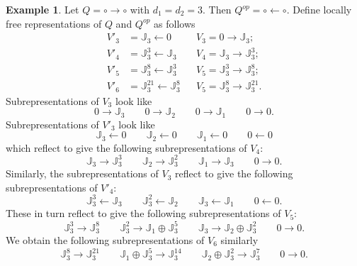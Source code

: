 \documentclass{amsart}
\numberwithin{equation}{section}
\theoremstyle{definition}
\newtheorem{example}[theorem]{Example}
\def\JJ{\mathbb{J}}
\begin{document}
\begin{example}
  Let $Q=\circ\longrightarrow\circ$ with $d_1=d_2=3$.  Then $Q^{op}=\circ\longleftarrow\circ$.  Define locally free representations of $Q$ and $Q^{op}$ as follows
  \begin{align*}
    V'_3&=\JJ_3\longleftarrow0 && V_3=0\longrightarrow\JJ_3;\\
    V'_4&=\JJ_3^3\longleftarrow\JJ_3 && V_4=\JJ_3\longrightarrow\JJ_3^3;\\
    V'_5&=\JJ_3^8\longleftarrow\JJ_3^3 && V_5=\JJ_3^3\longrightarrow\JJ_3^8;\\
    V'_6&=\JJ_3^{21}\longleftarrow\JJ_3^8 && V_5=\JJ_3^8\longrightarrow\JJ_3^{21}.
  \end{align*}
  Subrepresentations of $V_3$ look like
  \[0\longrightarrow\JJ_3\qquad 0\longrightarrow\JJ_2\qquad 0\longrightarrow\JJ_1\qquad 0\longrightarrow0.\]
  Subrepresentations of $V'_3$ look like
  \[\JJ_3\longleftarrow0\qquad \JJ_2\longleftarrow0\qquad \JJ_1\longleftarrow0\qquad 0\longleftarrow0\]
  which reflect to give the following subrepresentations of $V_4$:
  \[\JJ_3\longrightarrow\JJ_3^3\qquad \JJ_2\longrightarrow\JJ_3^2\qquad \JJ_1\longrightarrow\JJ_3\qquad 0\longrightarrow0.\]
  Similarly, the subrepresentations of $V_3$ reflect to give the following subrepresentations of $V'_4$:
  \[\JJ_3^3\longleftarrow\JJ_3\qquad \JJ_3^2\longleftarrow\JJ_2\qquad \JJ_3\longleftarrow\JJ_1\qquad 0\longleftarrow0.\]
  These in turn reflect to give the following subrepresentations of $V_5$:
  \[\JJ_3^3\longrightarrow\JJ_3^8\qquad \JJ_3^2\longrightarrow\JJ_1\oplus\JJ_3^5\qquad \JJ_3\longrightarrow\JJ_2\oplus\JJ_3^2\qquad 0\longrightarrow0.\]
  We obtain the following subrepresentations of $V_6$ similarly
  \[\JJ_3^8\longrightarrow\JJ_3^{21}\qquad \JJ_1\oplus\JJ_3^5\longrightarrow\JJ_3^{14}\qquad \JJ_2\oplus\JJ_3^2\longrightarrow\JJ_3^7\qquad 0\longrightarrow0.\]
\end{example}



\end{document}
